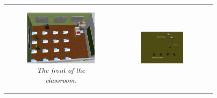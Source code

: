 \documentclass[11pt,letterpaper]{article}
\begin{document}
\begin{figure}
\centering
\begin{tabular}{c c c} 
  \begin{subfigure}[b]{0.32\textwidth}
  \includegraphics[width=\textwidth]{figures/classroom.png}
  \caption{\textit{The front of the classroom}.}
  \end{subfigure} &
\begin{subfigure}[b]{0.32\textwidth}
  \includegraphics[width=\textwidth]{figures/safety-3.jpg}

\end{subfigure}
\end{tabular}
\end{figure}
\end{document}
